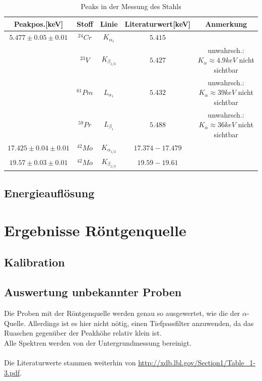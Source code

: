 \documentclass[12pt,a4paper]{article}
\begin{document}
\begin{table}
\center
\begin{tabular}{|c|c|c|c|c|}
\hline 
Peakpos.[keV] & Stoff & Linie & Literaturwert[keV] & Anmerkung \\
\hline 
$5.477\pm 0.05\pm 0.01$& $^{24}Cr$ & $K_{\alpha_{1}}$ & $5.415$ & \\ 
& $^{23}V$ & $K_{\beta_{1/3}}$ & $5.427$ & unwahrsch.: $K_{\alpha}\approx 4.9keV$ nicht sichtbar\\ 
& $^{61}Pm$ & $L_{\alpha_{1}}$ & $5.432$ & unwahrsch.: $K_{\alpha}\approx 39keV$ nicht sichtbar\\ 
& $^{59}Pr$ & $L_{\beta_{1}}$ & $5.488$ & unwahrsch.: $K_{\alpha}\approx 36keV$ nicht sichtbar\\ 
\hline 
$17.425\pm 0.04\pm 0.01$ & $^{42}Mo$ & $K_{\alpha_{1/2}}$ & $17.374-17.479$ & \\ 
\hline 
$19.57\pm 0.03\pm 0.01$ & $^{42}Mo$ & $K_{\beta_{1/3}}$ & $19.59-19.61$ & \\
 \hline 
\end{tabular} 
\caption{Peaks in der Messung des Stahls}
\label{tab:a_peaks_stahl}
\end{table}

\subsection{Energieauflösung}
\section{Ergebnisse Röntgenquelle}
\subsection{Kalibration}

\subsection{Auswertung unbekannter Proben}
Die Proben mit der Röntgenquelle werden genau so ausgewertet, wie die der $\alpha$-Quelle. Allerdings ist es hier nicht nötig, einen Tiefpassfilter anzuwenden, da das Ruaschen gegenüber der Peakhöhe relativ klein ist.\\
Alle Spektren werden von der Untergrundmessung bereinigt.\\
\\
Die Literaturwerte stammen weiterhin von \url{http://xdb.lbl.gov/Section1/Table_1-3.pdf}.
\end{document}
